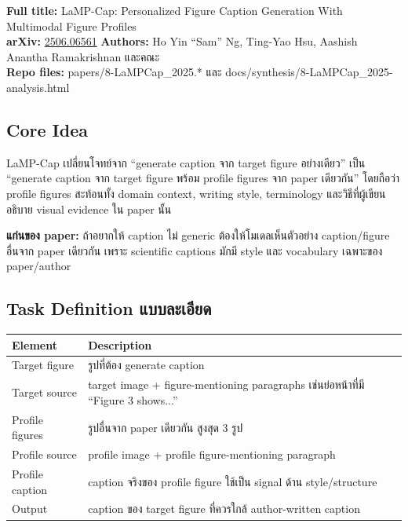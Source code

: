 \documentclass[10pt,a4paper]{article}
\begin{document}
\textbf{Full title:} LaMP-Cap: Personalized Figure Caption Generation With Multimodal Figure Profiles \\
\textbf{arXiv:} \href{https://arxiv.org/abs/2506.06561}{2506.06561} \quad
\textbf{Authors:} Ho Yin ``Sam'' Ng, Ting-Yao Hsu, Aashish Anantha Ramakrishnan และคณะ \\
\textbf{Repo files:} papers/8-LaMPCap\_2025.* และ docs/synthesis/8-LaMPCap\_2025-analysis.html

\subsection{Core Idea}
LaMP-Cap เปลี่ยนโจทย์จาก ``generate caption จาก target figure อย่างเดียว'' เป็น ``generate caption จาก target figure พร้อม profile figures จาก paper เดียวกัน'' โดยถือว่า profile figures สะท้อนทั้ง domain context, writing style, terminology และวิธีที่ผู้เขียนอธิบาย visual evidence ใน paper นั้น

\begin{note}
\textbf{แก่นของ paper:} ถ้าอยากให้ caption ไม่ generic ต้องให้โมเดลเห็นตัวอย่าง caption/figure อื่นจาก paper เดียวกัน เพราะ scientific captions มักมี style และ vocabulary เฉพาะของ paper/author
\end{note}

\subsection{Task Definition แบบละเอียด}
\begin{longtable}{@{}L{3cm}L{11.6cm}@{}}
\toprule
\textbf{Element} & \textbf{Description} \\
\midrule
Target figure & รูปที่ต้อง generate caption \\
Target source & target image + figure-mentioning paragraphs เช่นย่อหน้าที่มี ``Figure 3 shows...'' \\
Profile figures & รูปอื่นจาก paper เดียวกัน สูงสุด 3 รูป \\
Profile source & profile image + profile figure-mentioning paragraph \\
Profile caption & caption จริงของ profile figure ใช้เป็น signal ด้าน style/structure \\
Output & caption ของ target figure ที่ควรใกล้ author-written caption \\
\bottomrule
\end{longtable}
\end{document}
